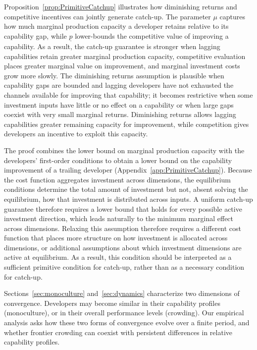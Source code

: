Proposition~\ref{prop:PrimitiveCatchup} illustrates how diminishing returns and competitive incentives can jointly generate catch-up. 
The parameter \(\mu\) captures how much marginal production capacity a developer retains relative to its capability gap, while \(\underline{p}\) lower-bounds the competitive value of improving a capability. 
As a result, the catch-up guarantee is stronger when lagging capabilities retain greater marginal production capacity, competitive evaluation places greater marginal value on improvement, and marginal investment costs grow more slowly. 
The diminishing returns assumption is plausible when capability gaps are bounded and lagging developers have not exhausted the channels available for improving that capability; it becomes restrictive when some investment inputs have little or no effect on a capability or when large gaps coexist with very small marginal returns. 
Diminishing returns allows lagging capabilities greater remaining capacity for improvement, while competition gives developers an incentive to exploit this capacity. 

The proof combines the lower bound on marginal production capacity with the developers' first-order conditions to obtain a lower bound on the capability improvement of a trailing developer (Appendix~\ref{app:PrimitiveCatchup}).
Because the cost function aggregates investment across dimensions, the equilibrium conditions determine the total amount of investment but not, absent solving the equilibrium, how that investment is distributed across inputs. 
A uniform catch-up guarantee therefore requires a lower bound that holds for every possible active investment direction, which leads naturally to the minimum marginal effect across dimensions.
Relaxing this assumption therefore requires a different cost function that places more structure on how investment is allocated across dimensions, or additional assumptions about which investment dimensions are active at equilibrium. 
As a result, this condition should be interpreted as a sufficient primitive condition for catch-up, rather than as a necessary condition for catch-up.

Sections~\ref{sec:monoculture} and~\ref{sec:dynamics} characterize two dimensions of convergence. 
Developers may become similar in their capability profiles (monoculture), or in their overall performance levels (crowding). 
Our empirical analysis asks how these two forms of convergence evolve over a finite period, and whether frontier crowding can coexist with persistent differences in relative capability profiles. 